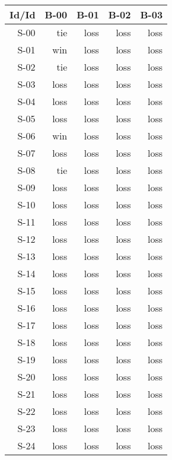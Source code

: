 \begin{tabular}{ | r | r | r | r | r | }
    \hline
        Id/Id  &   B-00  &   B-01  &   B-02  &   B-03  \\
    \hline
    \hline
         S-00  &    tie  &   loss  &   loss  &   loss  \\
    \hline
         S-01  &    win  &   loss  &   loss  &   loss  \\
    \hline
         S-02  &    tie  &   loss  &   loss  &   loss  \\
    \hline
         S-03  &   loss  &   loss  &   loss  &   loss  \\
    \hline
         S-04  &   loss  &   loss  &   loss  &   loss  \\
    \hline
         S-05  &   loss  &   loss  &   loss  &   loss  \\
    \hline
         S-06  &    win  &   loss  &   loss  &   loss  \\
    \hline
         S-07  &   loss  &   loss  &   loss  &   loss  \\
    \hline
         S-08  &    tie  &   loss  &   loss  &   loss  \\
    \hline
         S-09  &   loss  &   loss  &   loss  &   loss  \\
    \hline
         S-10  &   loss  &   loss  &   loss  &   loss  \\
    \hline
         S-11  &   loss  &   loss  &   loss  &   loss  \\
    \hline
         S-12  &   loss  &   loss  &   loss  &   loss  \\
    \hline
         S-13  &   loss  &   loss  &   loss  &   loss  \\
    \hline
         S-14  &   loss  &   loss  &   loss  &   loss  \\
    \hline
         S-15  &   loss  &   loss  &   loss  &   loss  \\
    \hline
         S-16  &   loss  &   loss  &   loss  &   loss  \\
    \hline
         S-17  &   loss  &   loss  &   loss  &   loss  \\
    \hline
         S-18  &   loss  &   loss  &   loss  &   loss  \\
    \hline
         S-19  &   loss  &   loss  &   loss  &   loss  \\
    \hline
         S-20  &   loss  &   loss  &   loss  &   loss  \\
    \hline
         S-21  &   loss  &   loss  &   loss  &   loss  \\
    \hline
         S-22  &   loss  &   loss  &   loss  &   loss  \\
    \hline
         S-23  &   loss  &   loss  &   loss  &   loss  \\
    \hline
         S-24  &   loss  &   loss  &   loss  &   loss  \\
    \hline
\end{tabular}


